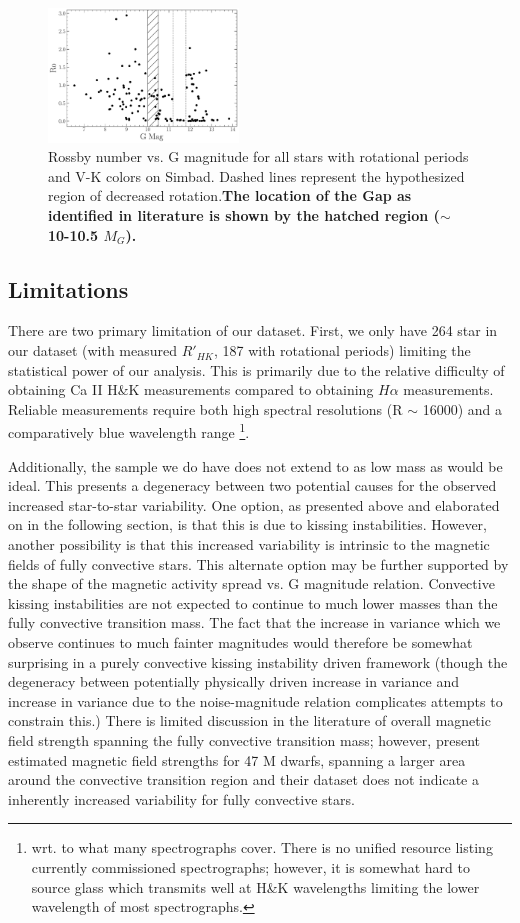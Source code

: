 \begin{figure}
  \centering
  \includegraphics[width=0.45\textwidth]{figures/Rossby.pdf}
  \caption{Rossby number vs. G magnitude for all stars with rotational periods
  and V-K colors on Simbad. Dashed lines represent the hypothesized region of decreased rotation.\textbf{The location of the Gap
  as identified in literature is shown by the hatched region ($\sim$ 10-10.5 $M_{G}$).}}
  \label{fig:rossby}
\end{figure}


\subsection{Limitations}
There are two primary limitation of our dataset. First, we only have 264 star
in our dataset (with measured $R'_{HK}$, 187 with rotational periods) limiting
the statistical power of our analysis. This is primarily due to the relative
difficulty of obtaining Ca II H\&K measurements compared to obtaining $H\alpha$
measurements. Reliable measurements require both high spectral resolutions (R
$\sim$ 16000) and a comparatively blue wavelength range \footnote{wrt. to what
many spectrographs cover. There is no unified resource listing currently
commissioned spectrographs; however, it is somewhat hard to source glass which
transmits well at H\&K wavelengths limiting the lower wavelength of most
spectrographs.}.

Additionally, the sample we do have does not extend to as low mass as would be
ideal. This presents a degeneracy between two potential causes for the observed
increased star-to-star variability. One option, as presented above and
elaborated on in the following section, is that this is due to kissing
instabilities. However, another possibility is that this increased variability
is intrinsic to the magnetic fields of fully convective stars. This alternate
option may be further supported by the shape of the magnetic activity spread vs.
G magnitude relation. Convective kissing instabilities are not expected to
continue to much lower masses than the fully convective transition mass. The
fact that the increase in variance which we observe continues to much fainter
magnitudes would therefore be somewhat surprising in a purely convective kissing
instability driven framework (though the degeneracy between potentially
physically driven increase in variance and increase in variance due to the
noise-magnitude relation complicates attempts to constrain this.) There is
limited discussion in the literature of overall magnetic field strength
spanning the fully convective transition mass; however, \citet{Shulyak2019}
present estimated magnetic field strengths for 47 M dwarfs, spanning a larger
area around the convective transition region and their dataset does not
indicate a inherently increased variability for fully convective stars.
